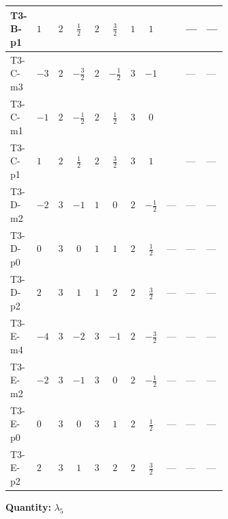 \documentclass[8pt]{article}
\begin{document}
\begin{landscape}
\begin{longtable}{@{}llcccccc >{\raggedright\arraybackslash}p{0.21\linewidth} >{\raggedright\arraybackslash}p{0.21\linewidth} >{\raggedright\arraybackslash}p{0.21\linewidth}@{}}
\midrule
T3-B-p1 & $1$ & $2$ & $\frac{1}{2}$ & $2$ & $\frac{3}{2}$ & $1$ & $1$ & \scriptsize\adjustbox{max width=\linewidth}{$\begin{gathered} -9 {g_1}^2 {\lambda_5}\end{gathered}$} & --- & --- \\
\midrule
T3-C-m3 & $-3$ & $2$ & $-\frac{3}{2}$ & $2$ & $-\frac{1}{2}$ & $3$ & $-1$ & \scriptsize\adjustbox{max width=\linewidth}{$\begin{gathered} -9 {g_1}^2 {\lambda_5}\end{gathered}$} & --- & --- \\
\midrule
T3-C-m1 & $-1$ & $2$ & $-\frac{1}{2}$ & $2$ & $\frac{1}{2}$ & $3$ & $0$ & \scriptsize\adjustbox{max width=\linewidth}{$\begin{gathered} -3 {g_1}^2 {\lambda_5}\end{gathered}$} & \scriptsize\adjustbox{max width=\linewidth}{$\begin{gathered} +3 \left({\lambda_{7}}\right)^{*} \operatorname{Tr}\!\left({y_2}\,\left({y_1}\right)^{\dagger}\right)\end{gathered}$} & \scriptsize\adjustbox{max width=\linewidth}{$\begin{gathered} +3 \left({\lambda_{8}}\right)^{*} \operatorname{Tr}\!\left({y_1}\,\left({y_2}\right)^{\dagger}\right)\end{gathered}$} \\
\midrule
T3-C-p1 & $1$ & $2$ & $\frac{1}{2}$ & $2$ & $\frac{3}{2}$ & $3$ & $1$ & \scriptsize\adjustbox{max width=\linewidth}{$\begin{gathered} -9 {g_1}^2 {\lambda_5}\end{gathered}$} & --- & --- \\
\midrule
T3-D-m2 & $-2$ & $3$ & $-1$ & $1$ & $0$ & $2$ & $-\frac{1}{2}$ & --- & --- & --- \\
\midrule
T3-D-p0 & $0$ & $3$ & $0$ & $1$ & $1$ & $2$ & $\frac{1}{2}$ & --- & --- & --- \\
\midrule
T3-D-p2 & $2$ & $3$ & $1$ & $1$ & $2$ & $2$ & $\frac{3}{2}$ & --- & --- & --- \\
\midrule
T3-E-m4 & $-4$ & $3$ & $-2$ & $3$ & $-1$ & $2$ & $-\frac{3}{2}$ & --- & --- & --- \\
\midrule
T3-E-m2 & $-2$ & $3$ & $-1$ & $3$ & $0$ & $2$ & $-\frac{1}{2}$ & --- & --- & --- \\
\midrule
T3-E-p0 & $0$ & $3$ & $0$ & $3$ & $1$ & $2$ & $\frac{1}{2}$ & --- & --- & --- \\
\midrule
T3-E-p2 & $2$ & $3$ & $1$ & $3$ & $2$ & $2$ & $\frac{3}{2}$ & --- & --- & --- \\
\midrule
\bottomrule
\end{longtable}
\clearpage
\noindent\textbf{Quantity: }$\lambda_5$\par\smallskip

\end{landscape}
\end{document}
